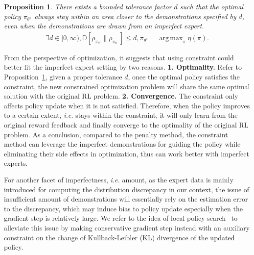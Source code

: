 \documentclass[letterpaper]{article} %
\newtheorem{proposition}{Proposition}
\DeclareMathOperator*{\argmax}{arg\,max}
\begin{document}
\begin{proposition}\label{prop:3}
There exists a bounded tolerance factor $d$ such that the optimal policy $\pi_{\theta^\star}$ always stay within an area closer to the demonstrations specified by $d$, even when the demonstrations are drawn from an imperfect expert.
\begin{align}
        \exists d\in [0, \infty), \mathbb{D}\left[\rho_{\pi_{\theta^\star}}\|\rho_{\pi_{\theta^-}}\right] \leqslant d, \pi_{\theta^\star} = \argmax_\pi \eta(\pi) \text{.}\nonumber
\end{align}
\end{proposition}
From the perspective of optimization, it suggests that using constraint could better fit the imperfect expert setting by two reasons. \textbf{1. Optimality.} Refer to Proposition~\ref{prop:3}, 
given a proper tolerance $d$, once the optimal policy satisfies the constraint, the new constrained optimization problem will share the same optimal solution with the original RL problem. \textbf{2. Convergence.} The constraint only affects policy update when it is not satisfied. Therefore, when the policy improves to a certain extent, \emph{i.e.} stays within the constraint, it will only learn from the original reward feedback and finally converge to the optimality of the original RL problem.
As a conclusion, compared to the penalty method, the constraint method can leverage the imperfect demonstrations for guiding the policy while eliminating their side effects in optimization, thus can work better with imperfect experts.

For another facet of imperfectness, \emph{i.e.} amount, as the expert data is mainly introduced for computing the distribution discrepancy in our context, the issue of insufficient amount of demonstrations will essentially rely on the estimation error to the discrepancy, which may induce bias to policy update especially when the gradient step is relatively large. We refer to the idea of local policy search~\cite{lps,lps2} to alleviate this issue by making conservative gradient step instead with an auxiliary constraint on the change of Kullback-Leibler (KL) divergence of the updated policy. 
\end{document}
